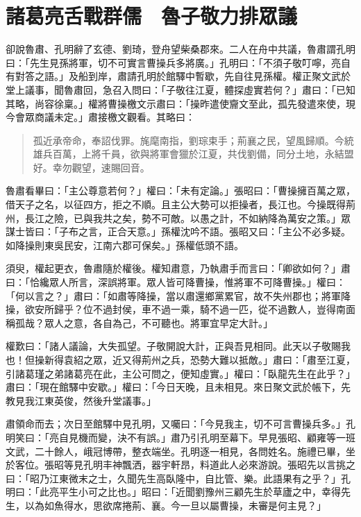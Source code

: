
\chapter{諸葛亮舌戰群儒　魯子敬力排眾議}

卻說魯肅、孔明辭了玄德、劉琦，登舟望柴桑郡來。二人在舟中共議，魯肅謂孔明曰：「先生見孫將軍，切不可實言曹操兵多將廣。」孔明曰：「不須子敬叮嚀，亮自有對答之語。」及船到岸，肅請孔明於館驛中暫歇，先自往見孫權。權正聚文武於堂上議事，聞魯肅回，急召入問曰：「子敬往江夏，體探虛實若何？」肅曰：「已知其略，尚容徐稟。」權將曹操檄文示肅曰：「操昨遣使齎文至此，孤先發遣來使，現今會眾商議未定。」肅接檄文觀看。其略曰：

\begin{quote}
孤近承帝命，奉詔伐罪。旄麾南指，劉琮束手；荊襄之民，望風歸順。今統雄兵百萬，上將千員，欲與將軍會獵於江夏，共伐劉備，同分土地，永結盟好。幸勿觀望，速賜回音。
\end{quote}

魯肅看畢曰：「主公尊意若何？」權曰：「未有定論。」張昭曰：「曹操擁百萬之眾，借天子之名，以征四方，拒之不順。且主公大勢可以拒操者，長江也。今操既得荊州，長江之險，已與我共之矣，勢不可敵。以愚之計，不如納降為萬安之策。」眾謀士皆曰：「子布之言，正合天意。」孫權沈吟不語。張昭又曰：「主公不必多疑。如降操則東吳民安，江南六郡可保矣。」孫權低頭不語。

須臾，權起更衣，魯肅隨於權後。權知肅意，乃執肅手而言曰：「卿欲如何？」肅曰：「恰纔眾人所言，深誤將軍。眾人皆可降曹操，惟將軍不可降曹操。」權曰：「何以言之？」肅曰：「如肅等降操，當以肅還鄉黨累官，故不失州郡也；將軍降操，欲安所歸乎？位不過封侯，車不過一乘，騎不過一匹，從不過數人，豈得南面稱孤哉？眾人之意，各自為己，不可聽也。將軍宜早定大計。」

權歎曰：「諸人議論，大失孤望。子敬開說大計，正與吾見相同。此天以子敬賜我也！但操新得袁紹之眾，近又得荊州之兵，恐勢大難以抵敵。」肅曰：「肅至江夏，引諸葛瑾之弟諸葛亮在此，主公可問之，便知虛實。」權曰：「臥龍先生在此乎？」肅曰：「現在館驛中安歇。」權曰：「今日天晚，且未相見。來日聚文武於帳下，先教見我江東英俊，然後升堂議事。」

肅領命而去；次日至館驛中見孔明，又囑曰：「今見我主，切不可言曹操兵多。」孔明笑曰：「亮自見機而變，決不有誤。」肅乃引孔明至幕下。早見張昭、顧雍等一班文武，二十餘人，峨冠博帶，整衣端坐。孔明逐一相見，各問姓名。施禮已畢，坐於客位。張昭等見孔明丰神飄洒，器宇軒昂，料道此人必來游說。張昭先以言挑之曰：「昭乃江東微末之士，久聞先生高臥隆中，自比管、樂。此語果有之乎？」孔明曰：「此亮平生小可之比也。」昭曰：「近聞劉豫州三顧先生於草廬之中，幸得先生，以為如魚得水，思欲席捲荊、襄。今一旦以屬曹操，未審是何主見？」

